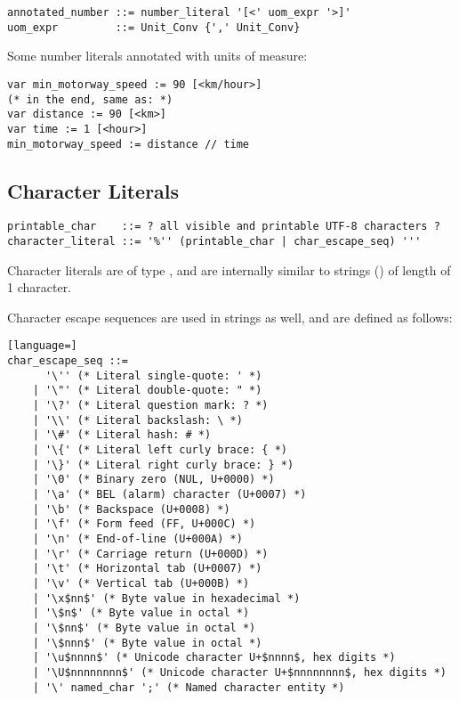 \syntax\begin{lstlisting}
annotated_number ::= number_literal '[<' uom_expr '>]'
uom_expr         ::= Unit_Conv {',' Unit_Conv}
\end{lstlisting}

\example Some number literals annotated with units of measure:
\begin{lstlisting}
var min_motorway_speed := 90 [<km/hour>]
(* in the end, same as: *)
var distance := 90 [<km>]
var time := 1 [<hour>]
min_motorway_speed := distance // time
\end{lstlisting}






\subsection{Character Literals}
\label{sec:characterliterals}

\syntax\begin{lstlisting}
printable_char    ::= ? all visible and printable UTF-8 characters ? 
character_literal ::= '%'' (printable_char | char_escape_seq) '''
\end{lstlisting}

Character literals are of type , and are internally similar to strings () of length of 1 character. 

Character escape sequences are used in strings as well, and are defined as follows: 

\syntax\begin{lstlisting}[language=]
char_escape_seq ::= 
      '\'' (* Literal single-quote: ' *)
    | '\"' (* Literal double-quote: " *)
    | '\?' (* Literal question mark: ? *)
    | '\\' (* Literal backslash: \ *)
    | '\#' (* Literal hash: # *)
    | '\{' (* Literal left curly brace: { *)
    | '\}' (* Literal right curly brace: } *)
    | '\0' (* Binary zero (NUL, U+0000) *)
    | '\a' (* BEL (alarm) character (U+0007) *)
    | '\b' (* Backspace (U+0008) *)
    | '\f' (* Form feed (FF, U+000C) *)
    | '\n' (* End-of-line (U+000A) *)
    | '\r' (* Carriage return (U+000D) *)
    | '\t' (* Horizontal tab (U+0007) *)
    | '\v' (* Vertical tab (U+000B) *)
    | '\x$nn$' (* Byte value in hexadecimal *) 
    | '\$n$' (* Byte value in octal *)
    | '\$nn$' (* Byte value in octal *)
    | '\$nnn$' (* Byte value in octal *)
    | '\u$nnnn$' (* Unicode character U+$nnnn$, hex digits *)
    | '\U$nnnnnnnn$' (* Unicode character U+$nnnnnnnn$, hex digits *)
    | '\' named_char ';' (* Named character entity *)
\end{lstlisting}


